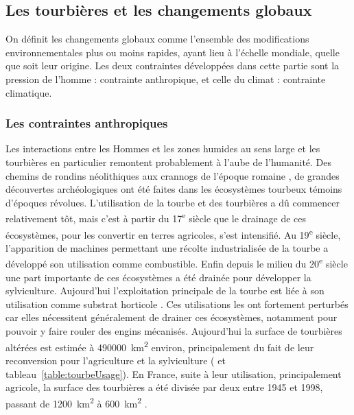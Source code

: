 \subsection{Les tourbières et les changements globaux}
On définit les changements globaux comme l'ensemble des modifications environnementales plus ou moins rapides, ayant lieu à l'échelle mondiale, quelle que soit leur origine. Les deux contraintes développées dans cette partie sont la pression de l'homme : contrainte anthropique, et celle du climat : contrainte climatique.

\subsubsection{Les contraintes anthropiques}

Les interactions entre les Hommes et les zones humides au sens large et les tourbières en particulier remontent probablement à l'aube de l'humanité.
Des chemins de rondins néolithiques aux crannogs de l'époque romaine \citep{buckland1993}, de grandes découvertes archéologiques ont été faites dans les écosystèmes tourbeux témoins d'époques révolues.
L’utilisation de la tourbe et des tourbières a dû commencer relativement tôt, mais c'est à partir du 17\textsuperscript{e} siècle que le drainage de ces écosystèmes, pour les convertir en terres agricoles, s'est intensifié.
Au 19\textsuperscript{e} siècle, l'apparition de machines permettant une récolte industrialisée de la tourbe a développé son utilisation comme combustible.
Enfin depuis le milieu du 20\textsuperscript{e} siècle une part importante de ces écosystèmes a été drainée pour développer la sylviculture.
Aujourd'hui l'exploitation principale de la tourbe est liée à son utilisation comme substrat horticole \citep{lappalainen1996,chapman2003}.
Ces utilisations les ont fortement perturbés car elles nécessitent généralement de drainer ces écosystèmes, notamment pour pouvoir y faire rouler des engins mécanisés.
Aujourd'hui la surface de tourbières altérées est estimée à \SI{490000}{\square\kilo\metre} environ, principalement du fait de leur reconversion pour l'agriculture et la sylviculture (\citealp{joosten2002} et tableau~\ref{table:tourbeUsage}).
En France, suite à leur utilisation, principalement agricole, la surface des tourbières a été divisée par deux entre 1945 et 1998, passant de \SI{1200}{\square\kilo\meter} à \SI{600}{\square\kilo\meter} \citep{lappalainen1996,manneville1999}.

